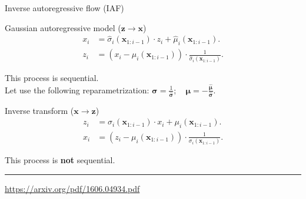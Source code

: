 \documentclass{beamer}
\newcommand{\bx}{\mathbf{x}}
\newcommand{\bz}{\mathbf{z}}
\newcommand{\bmu}{\boldsymbol{\mu}}
\newcommand{\bsigma}{\boldsymbol{\sigma}}
\begin{document}
\begin{frame}{Inverse autoregressive flow (IAF)}
	
	\begin{block}{Gaussian autoregressive model ($\bz \rightarrow \bx$)}
		\vspace{-0.3cm}
		\begin{align*}
		x_i &= \hat{\sigma}_i (\bx_{1:i-1}) \cdot z_i + \hat{\mu}_i(\bx_{1:i-1}).\\
		z_i &= \left(x_i - \hat{\mu}_i(\bx_{1:i-1}) \right) \cdot \frac{1}{ \hat{\sigma}_i (\bx_{1:i-1})}.
		\end{align*}
		\vspace{-0.3cm}
	\end{block}
	This process is sequential. \\
	Let use the following reparametrization:
	$\bsigma = \frac{1}{\hat{\bsigma}}; \quad \bmu = - \frac{\hat{\bmu}}{\hat{\bsigma}}.$
	
	\begin{block}{Inverse transform ($\bx \rightarrow \bz$)}
		\vspace{-0.3cm}
		\begin{align*}
		z_i &= \sigma_i (\bx_{1:i-1}) \cdot x_i + \mu_i(\bx_{1:i-1}). \\
		x_i &= \left( z_i - \mu_i(\bx_{1:i-1})\right) \cdot \frac{1}{\sigma_i (\bx_{1:i-1}) }.
		\end{align*}
		\vspace{-0.3cm}
	\end{block}
	This process is \textbf{not} sequential.
	\vfill
	\hrule\medskip
	{\scriptsize \href{https://arxiv.org/pdf/1606.04934.pdf}{https://arxiv.org/pdf/1606.04934.pdf}} 
\end{frame}
\end{document}
